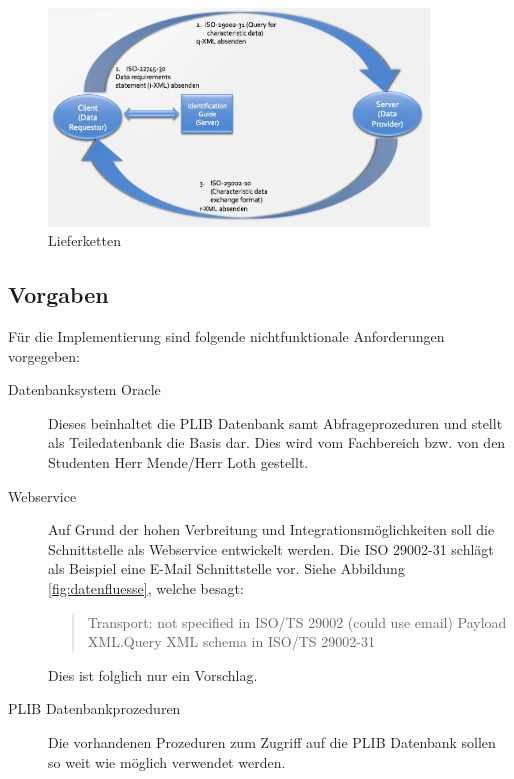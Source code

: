\begin{figure}[htbp]
	\centering
		\includegraphics[width=0.90\textwidth]{images/lieferketten_plib.jpg}
		\caption[Lieferketten]{Lieferketten\footnotemark}
	\label{fig:lieferketten}
\end{figure}

\subsection{Vorgaben}

Für die Implementierung sind folgende nichtfunktionale Anforderungen vorgegeben:
\begin{description}
\item[Datenbanksystem Oracle] Dieses beinhaltet die PLIB Datenbank samt Abfrageprozeduren und stellt als Teiledatenbank die Basis dar. Dies wird vom Fachbereich bzw. von den Studenten Herr Mende/Herr Loth gestellt.
\item[Webservice] Auf Grund der hohen Verbreitung und Integrationsmöglichkeiten soll die Schnittstelle als \gls{Webservice} entwickelt werden. Die ISO 29002-31 schlägt als Beispiel eine E-Mail Schnittstelle vor. Siehe Abbildung \autoref{fig:datenfluesse}, welche besagt:
\begin{quotation}
Transport: not specified in ISO/TS 29002 (could use email) Payload XML.Query XML schema in ISO/TS 29002-31
\end{quotation}
Dies ist folglich nur ein Vorschlag. 
\item[PLIB Datenbankprozeduren] Die vorhandenen Prozeduren zum Zugriff auf die PLIB Datenbank sollen so weit wie möglich verwendet werden. 
\end{description}

